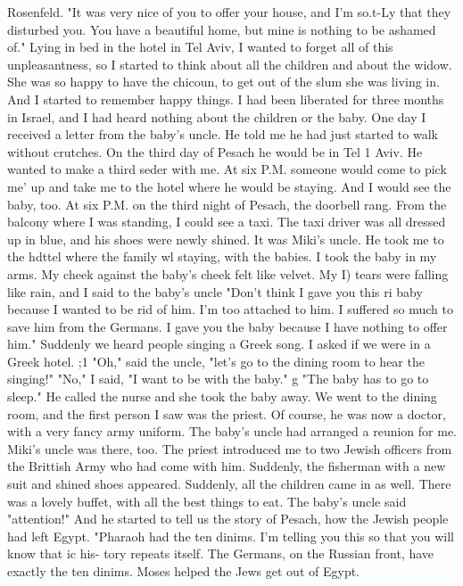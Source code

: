{Rosenfeld.
"It was very nice of you to offer 
your house, and I'm so.t-Ly that they disturbed you.
You have a beautiful home, but mine 
is nothing to be ashamed of."
Lying in bed in the hotel in Tel Aviv, I wanted to forget all of this unpleasantness, 
so I started to think about all the children and about the widow.
She was so happy to 
have the chicoun, to get out of the slum she was living in.
And I started to remember 
happy things.
I had been liberated for three months in Israel, and I had heard nothing about the 
children or the baby.
One day I received a letter from the baby's uncle.
He told me he 
had just started to walk without crutches.
On the third day of Pesach he would be in Tel 1 
Aviv.
He wanted to make a third seder with me.
At six P.M.
someone would come to pick me' 
up and take me to the hotel where he would be staying.
And I would see the baby, too.
At six P.M.
on the third night of Pesach, the doorbell rang.
From the balcony where 
I was standing, I could see a taxi.
The taxi driver was all dressed up in blue, and his 
shoes were newly shined.
It was Miki's uncle.
He took me to the hdttel where the family wl 
staying, with the babies.
I took the baby in my arms.
My cheek against the baby's cheek felt like velvet.
My 
I) 
tears were falling like rain, and I said to the baby's uncle "Don't think I gave you this ri 
baby because I wanted to be rid of him.
I'm too attached to him.
I suffered so much to 
save him from the Germans.
I gave you the baby because I have nothing to offer him."
Suddenly we heard people singing a Greek song.
I asked if we were in a Greek hotel.
;1 
"Oh," said the uncle, "let's go to the dining room to hear the singing!"
"No," I said, 
"I want to be with the baby."
g "The baby has to go to sleep."
He called the nurse and 
she took the baby away.
We went to the dining room, and the first person I saw was the priest.
Of course, he 
was now a doctor, with a very fancy army uniform.
The baby's uncle had arranged a reunion 
for me.
Miki's uncle was there, too.
The priest introduced me to two Jewish officers 
from the Brittish Army who had come with him.
Suddenly, the fisherman with a new suit 
and shined shoes appeared.
Suddenly, all the children came in as well.
There was a lovely buffet, with all the best things to eat.
The baby's uncle said 
"attention!"
And he started to tell us the story of Pesach, how the Jewish people had 
left Egypt.
"Pharaoh had the ten dinims.
I'm telling you this so that you will know that ic his-
tory repeats itself.
The Germans, on the Russian front, have exactly the ten dinims.
Moses helped the Jews get out of Egypt.
}
